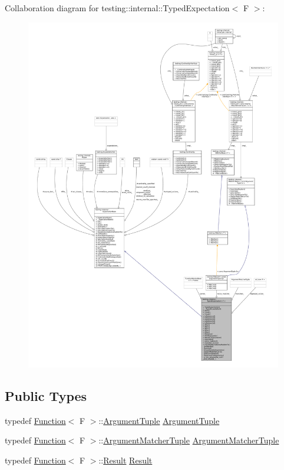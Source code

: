 Collaboration diagram for testing\+:\+:internal\+:\+:Typed\+Expectation$<$ F $>$\+:
\nopagebreak
\begin{figure}[H]
\begin{center}
\leavevmode
\includegraphics[width=350pt]{classtesting_1_1internal_1_1TypedExpectation__coll__graph}
\end{center}
\end{figure}
\subsection*{Public Types}
\begin{DoxyCompactItemize}
\item 
typedef \hyperlink{structtesting_1_1internal_1_1Function}{Function}$<$ F $>$\+::\hyperlink{classtesting_1_1internal_1_1TypedExpectation_a9a91379262d101f435809ba4556d14fa}{Argument\+Tuple} \hyperlink{classtesting_1_1internal_1_1TypedExpectation_a9a91379262d101f435809ba4556d14fa}{Argument\+Tuple}
\item 
typedef \hyperlink{structtesting_1_1internal_1_1Function}{Function}$<$ F $>$\+::\hyperlink{classtesting_1_1internal_1_1TypedExpectation_a8f10e3906761cc5c10fa3561c6e8938e}{Argument\+Matcher\+Tuple} \hyperlink{classtesting_1_1internal_1_1TypedExpectation_a8f10e3906761cc5c10fa3561c6e8938e}{Argument\+Matcher\+Tuple}
\item 
typedef \hyperlink{structtesting_1_1internal_1_1Function}{Function}$<$ F $>$\+::\hyperlink{classtesting_1_1internal_1_1TypedExpectation_a6503597ee9d5ec940bfe8e51832b2422}{Result} \hyperlink{classtesting_1_1internal_1_1TypedExpectation_a6503597ee9d5ec940bfe8e51832b2422}{Result}
\end{DoxyCompactItemize}
